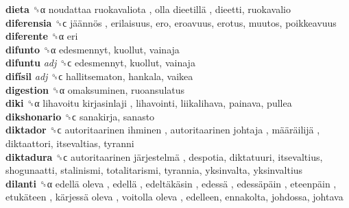 \textbf{dieta} ␝α   noudattaa ruokavaliota ,  olla dieetillä , dieetti, ruokavalio  \\
\textbf{diferensia} ␝ϲ   jäännös , erilaisuus, ero, eroavuus, erotus, muutos, poikkeavuus  \\
\textbf{diferente} ␝α  eri  \\
\textbf{difunto} ␝α  edesmennyt, kuollut, vainaja  \\
\textbf{difuntu} \emph{adj}  ␝ϲ  edesmennyt, kuollut, vainaja  \\
\textbf{difísil} \emph{adj}  ␝ϲ  hallitsematon, hankala, vaikea  \\
\textbf{digestion} ␝α  omaksuminen, ruoansulatus  \\
\textbf{diki} ␝α   lihavoitu kirjasinlaji , lihavointi, liikalihava, painava, pullea  \\
\textbf{dikshonario} ␝ϲ  sanakirja, sanasto  \\
\textbf{diktador} ␝ϲ   autoritaarinen ihminen ,  autoritaarinen johtaja ,  määräilijä , diktaattori, itsevaltias, tyranni  \\
\textbf{diktadura} ␝ϲ   autoritaarinen järjestelmä , despotia, diktatuuri, itsevaltius, shogunaatti, stalinismi, totalitarismi, tyrannia, yksinvalta, yksinvaltius  \\
\textbf{dilanti} ␝α   edellä oleva ,  edellä ,  edeltäkäsin ,  edessä ,  edessäpäin ,  eteenpäin ,  etukäteen ,  kärjessä oleva ,  voitolla oleva , edelleen, ennakolta, johdossa, johtava  \\
